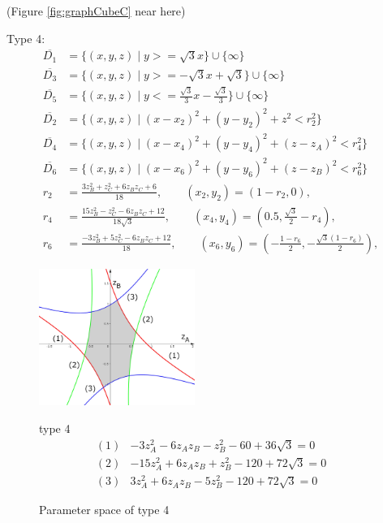 \documentclass[suppldata, dvipdfmx]{interact}
\theoremstyle{plain}%
\theoremstyle{definition}
\theoremstyle{remark}
\theoremstyle{problemstyle}
\begin{document}
\noindent(Figure \ref{fig:graphCubeC} near here)
\bigskip\par
Type 4:
\begin{align*}
\overline{D_1}&=\{ (x,y,z) \mid y >= \sqrt{3}x \} \cup \{ \infty \}\\
\overline{D_3}&=\{(x,y,z) \mid y >= -\sqrt{3}x + \sqrt{3} \} \cup\{\infty\}\\
\overline{D_5}&=\{(x,y,z) \mid y <= \frac{\sqrt{3}}{3}x - \frac{\sqrt{3}}{3} \} \cup\{\infty\}\\
\overline{D_2}&=\{(x,y,z) \mid (x-x_2)^2+(y-y_2)^2+z^2<r_2^2 \} \\
\overline{D_4}&=\{(x,y,z) \mid (x-x_4)^2+(y-y_4)^2+(z-z_A)^2<r_4^2 \} \\
\overline{D_6}&=\{(x,y,z) \mid (x-x_6)^2+(y-y_6)^2+(z-z_B)^2<r_6^2 \} \\
 r_2 &= \frac{3z_B^2 + z_C^2 + 6z_Bz_C + 6}{18}, \qquad
(x_2, y_2) = \left(1 - r_2, 0\right),\\
 r_4 &= \frac{15z_B^2 - z_C^2 - 6z_Bz_C + 12}{18\sqrt{3}}, \qquad
(x_4, y_4) = \left(0.5, \frac{\sqrt{3}}{2} - r_4\right),\\
 r_6 &= \frac{-3z_B^2 + 5z_C^2 - 6z_Bz_C + 12}{18}, \qquad
(x_6, y_6) = \left(-\frac{1 - r_6}{2}, -\frac{\sqrt{3}(1 - r_6)}{2}\right),
\end{align*} 
\begin{figure}[h]
 \begin{minipage}[]{0.5\textwidth}
 \centering
 \includegraphics[width=2in,
 keepaspectratio]{./img/graph/cubeD.jpg}
 \caption{Parameter space of type 4}
 \label{fig:graphCubeD}
 \end{minipage}
 \hspace*{\fill}
 \begin{minipage}[]{0.5\textwidth}
  \centering
  type 4
  \begin{align*}
   (1)& -3z_A^2 - 6z_A z_B - z_B^2 -60 +36\sqrt{3} = 0\\
   (2)& -15 z_A^2 + 6z_Az_B + z_B^2 - 120 + 72\sqrt{3} = 0\\
   (3)& 3z_A^2 + 6z_Az_B - 5z_B^2 - 120 + 72 \sqrt{3} = 0
  \end{align*}
 \end{minipage}
 \hspace*{\fill}
\end{figure}
\end{document}
